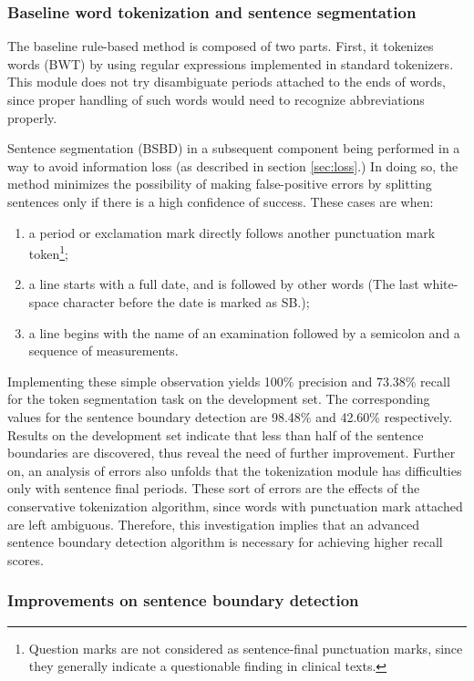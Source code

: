 \subsubsection{Baseline word tokenization and sentence segmentation}

The baseline rule-based method is composed of two parts. First, it tokenizes words (BWT) by using regular expressions implemented in standard tokenizers. This module does not try disambiguate periods attached to the ends of words, since proper handling of such words would need to recognize abbreviations properly. 

Sentence segmentation (BSBD) in a subsequent component being performed in a way to avoid information loss (as described in section \ref{sec:loss}.) 
In doing so, the method minimizes the possibility of making false-positive errors by splitting sentences only if there is a high confidence of success. 
These cases are when:
\begin{enumerate} 
 \item a period or exclamation mark directly follows another punctuation mark token\footnote{Question marks are not considered as sentence-final punctuation marks, since they generally indicate a questionable finding in clinical texts.};
 \item a line starts with a full date, and is followed by other words (The last white-space character before the date is marked as SB.);
 \item a line begins with the name of an examination followed by a semicolon and a sequence of measurements.
\end{enumerate}

Implementing these simple observation yields 100\% precision and 73.38\% recall for the token segmentation task on the development set. The corresponding values for the sentence boundary detection are 98.48\% and 42.60\% respectively. 
Results on the development set indicate that less than half of the sentence boundaries are discovered, thus reveal the need of further improvement.
Further on, an analysis of errors also unfolds that the tokenization module has difficulties only with sentence final periods. These sort of errors are the effects of the conservative tokenization algorithm, since words with punctuation mark attached are left ambiguous.
Therefore, this investigation implies that an advanced sentence boundary detection algorithm is necessary for achieving higher recall scores.

\subsubsection{Improvements on sentence boundary detection}\label{sec:improvements}

